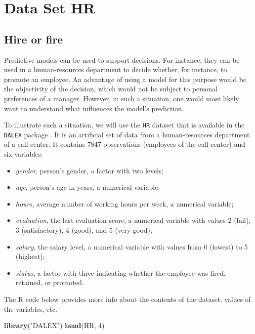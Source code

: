 \documentclass[12pt,]{krantz}
\newenvironment{Shaded}{\begin{snugshade}}{\end{snugshade}}
\newcommand{\DecValTok}[1]{\textcolor[rgb]{0.00,0.00,0.81}{#1}}
\newcommand{\KeywordTok}[1]{\textcolor[rgb]{0.13,0.29,0.53}{\textbf{#1}}}
\newcommand{\NormalTok}[1]{#1}
\newcommand{\StringTok}[1]{\textcolor[rgb]{0.31,0.60,0.02}{#1}}
\providecommand{\tightlist}{%
  \setlength{\itemsep}{0pt}\setlength{\parskip}{0pt}}
\begin{document}
\hypertarget{data-set-hr}{%
\section{Data Set HR}\label{data-set-hr}}

\hypertarget{HFDataset}{%
\subsection{Hire or fire}\label{HFDataset}}

Predictive models can be used to support decisions. For instance, they can be used in a human-resources department to decide whether, for instance, to promote an employee. An advantage of using a model for this purpose would be the objectivity of the decision, which would not be subject to personal preferences of a manager. However, in such a situation, one would most likely want to understand what influences the model's prediction.

To illustrate such a situation, we will use the \texttt{HR} dataset that is available in the \texttt{DALEX} package \citep{R-DALEX}. It is an artificial set of data from a human-resources department of a call center. It contains 7847 observations (employees of the call center) and six variables:

\begin{itemize}
\tightlist
\item
  \emph{gender}, person's gender, a factor with two levels;
\item
  \emph{age}, person's age in years, a numerical variable;
\item
  \emph{hours}, average number of working hours per week, a numerical variable;
\item
  \emph{evaluation}, the last evaluation score, a numerical variable with values 2 (fail), 3 (satisfactory), 4 (good), and 5 (very good);
\item
  \emph{salary}, the salary level, a numerical variable with values from 0 (lowest) to 5 (highest);
\item
  \emph{status}, a factor with three indicating whether the employee was fired, retained, or promoted.
\end{itemize}

The R code below provides more info about the contents of the dataset, values of the variables, etc.

\begin{Shaded}
\begin{Highlighting}[]
\KeywordTok{library}\NormalTok{(}\StringTok{"DALEX"}\NormalTok{)}
\KeywordTok{head}\NormalTok{(HR, }\DecValTok{4}\NormalTok{)}
\end{Highlighting}
\end{Shaded}
\end{document}
